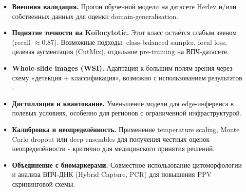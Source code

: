 \documentclass[14pt,a4paper]{extreport}
\begin{document}
\begin{itemize}
    \item \textbf{Внешняя валидация.} Прогон обученной модели на
          датасете Herlev и/или собственных данных для оценки
          domain-generalisation.
    \item \textbf{Поднятие точности на Koilocytotic.} Этот класс
          остаётся слабым звеном (recall $\approx 0.87$). Возможные
          подходы: class-balanced sampler, focal loss, целевая
          аугментация (CutMix), отдельное pre-training на ВПЧ-датасете.
    \item \textbf{Whole-slide images (WSI).} Адаптация к большим полям
          зрения через схему «детекция + классификация», возможно с
          использованием результатов \cite{zhang2025large}.
    \item \textbf{Дистилляция и квантование.} Уменьшение модели для
          edge-инференса в полевых условиях, особенно для регионов с
          ограниченной инфраструктурой.
    \item \textbf{Калибровка и неопределённость.} Применение
          temperature scaling, Monte Carlo dropout или deep ensembles
          для получения честных оценок неопределённости - критично
          для медицинского принятия решений.
    \item \textbf{Объединение с биомаркерами.} Совместное использование
          цитоморфологии и анализа ВПЧ-ДНК (Hybrid Capture, PCR) для
          повышения PPV скрининговой схемы.
\end{itemize}
\end{document}
